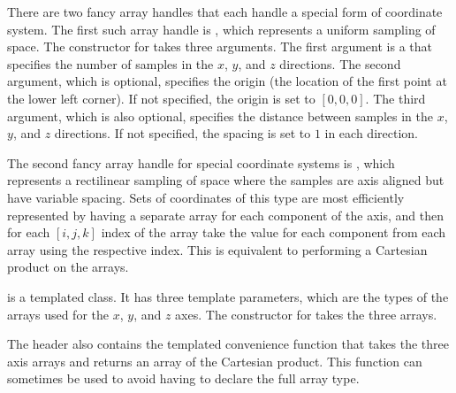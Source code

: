 There are two fancy array handles that each handle a special form of
coordinate system. The first such array handle is
, which represents a uniform
sampling of space. The constructor for
 takes three arguments.
The first argument is a  that specifies the number of samples in
the $x$, $y$, and $z$ directions. The second argument, which is optional,
specifies the origin (the location of the first point at the lower left
corner). If not specified, the origin is set to $[0,0,0]$. The third
argument, which is also optional, specifies the distance between samples in
the $x$, $y$, and $z$ directions. If not specified, the spacing is set to
$1$ in each direction.




The second fancy array handle for special coordinate systems is
, which represents a rectilinear
sampling of space where the samples are axis aligned but have variable
spacing. Sets of coordinates of this type are most efficiently represented
by having a separate array for each component of the axis, and then for
each $[i,j,k]$ index of the array take the value for each component from
each array using the respective index. This is equivalent to performing a
Cartesian product on the arrays.

 is a templated class. It has
three template parameters, which are the types of the arrays used for the
$x$, $y$, and $z$ axes. The constructor for
 takes the three arrays.


The  header also
contains the templated convenience function
 that takes the three axis
arrays and returns an array of the Cartesian product. This function can
sometimes be used to avoid having to declare the full array type.

